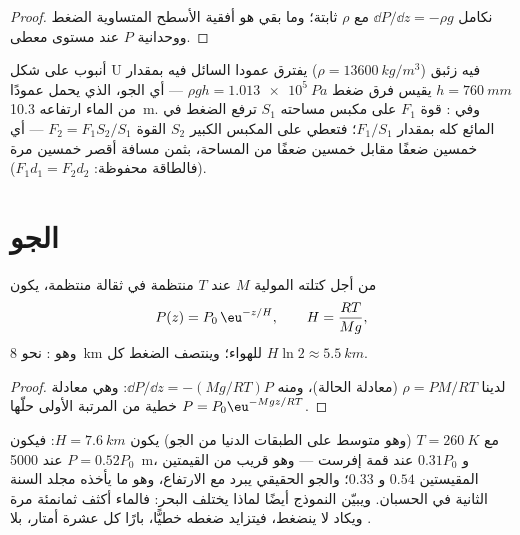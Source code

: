 \begin{proof}
نكامل $\dd P/\dd z = -\rho g$ مع $\rho$ ثابتة؛ وما بقي هو أفقية
الأسطح المتساوية الضغط ووحدانية $P$ عند مستوى معطى.
\end{proof}

\begin{example}\label{ex:b1:fluid-statics:manometer}
أنبوب على شكل U فيه زئبق ($\rho = \qty{13600}{kg/m^3}$) يفترق
عمودا السائل فيه بمقدار $h = \qty{760}{mm}$ يقيس فرق ضغط
$\rho gh = \qty{1.013e5}{Pa}$ --- أي الجو، الذي يحمل عمودًا من الماء
ارتفاعه \qty{10.3}{m}. وفي : قوة $F_1$ على مكبس
مساحته $S_1$ ترفع الضغط في المائع كله بمقدار $F_1/S_1$؛ فتعطي
على المكبس الكبير $S_2$ القوة $F_2 = F_1S_2/S_1$ --- أي خمسين ضعفًا
مقابل خمسين ضعفًا من المساحة، بثمن مسافة أقصر خمسين مرة
(فالطاقة محفوظة: $F_1d_1 = F_2d_2$).
\end{example}

\section{الجو}

\begin{proposition}\label{prop:b1:fluid-statics:atmosphere}
من أجل  كتلته المولية $M$ عند  $T$ منتظمة
في ثقالة منتظمة، يكون
\[
P(z) = P_0\,\eu^{-z/H}, \qquad H = \frac{RT}{Mg} ,
\]
وهو \emph{}: نحو \qty{8}{km} للهواء؛ وينتصف الضغط
كل $H\ln2 \approx \qty{5.5}{km}$.
\end{proposition}

\begin{proof}
لدينا $\rho = PM/RT$ (معادلة الحالة)، ومنه $\dd P/\dd z = -(Mg/RT)P$: وهي
معادلة خطية من المرتبة الأولى حلّها $P = P_0\eu^{-Mgz/RT}$.
\end{proof}

\begin{example}\label{ex:b1:fluid-statics:altitude}
مع $T = \qty{260}{K}$ (وهو متوسط على الطبقات الدنيا من الجو) يكون $H =
\qty{7.6}{km}$: فيكون $P = 0.52P_0$ عند \qty{5000}{m}،
و $0.31P_0$ عند قمة إفرست --- وهو قريب من القيمتين المقيستين
$0.54$ و $0.33$؛ والجو الحقيقي يبرد مع الارتفاع، وهو ما يأخذه
مجلد السنة الثانية في الحسبان. ويبيّن النموذج أيضًا لماذا يختلف
البحر: فالماء أكثف ثمانمئة مرة ويكاد لا ينضغط، فيتزايد ضغطه
خطيًّا، بارًا كل عشرة أمتار، بلا .
\end{example}

